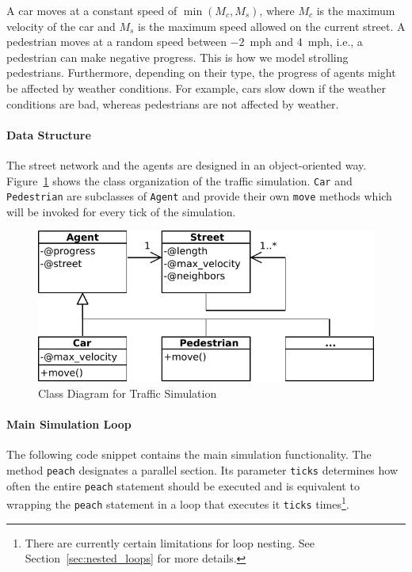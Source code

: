 \documentclass[preprint]{sigplanconf}
\begin{document}
A car moves at a constant speed of $\min(M_c, M_s)$, where $M_c$ is the maximum velocity of the car and $M_s$ is the maximum speed allowed on the current street. A pedestrian moves at a random speed between $-2$~mph and $4$~mph, i.e., a pedestrian can make negative progress. This is how we model strolling pedestrians. Furthermore, depending on their type, the progress of agents might be affected by weather conditions. For example, cars slow down if the weather conditions are bad, whereas pedestrians are not affected by weather.

\paragraph{Data Structure}
The street network and the agents are designed in an object-oriented way. Figure~\ref{fig:running_example_classes} shows the class organization of the traffic simulation. \texttt{Car} and \texttt{Pedestrian} are subclasses of \texttt{Agent} and provide their own \texttt{move} methods which will be invoked for every tick of the simulation. 

\begin{figure}[!htp]
    \centering
    \includegraphics[width=0.8\columnwidth]{class_diagram_running_ex.pdf}
    \caption{Class Diagram for Traffic Simulation}
    \label{fig:running_example_classes}
\end{figure}

\paragraph{Main Simulation Loop}
The following code snippet contains the main simulation functionality. The method \texttt{peach} designates a parallel section. Its parameter \texttt{ticks} determines how often the entire \texttt{peach} statement should be executed and is equivalent to wrapping the \texttt{peach} statement in a loop that executes it \texttt{ticks} times\footnote{There are currently certain limitations for loop nesting. See Section~\ref{sec:nested_loops} for more details.}.
\end{document}
